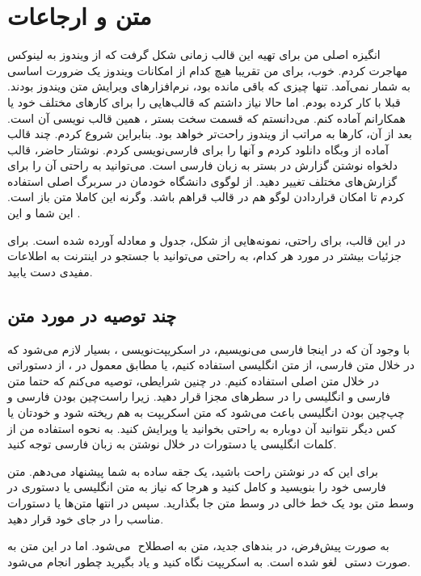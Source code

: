 \chapter{
متن و ارجاعات
}
\label{chap1}

انگیزه اصلی من برای تهیه این قالب زمانی شکل گرفت که از ویندوز به لینوکس مهاجرت کردم. خوب، برای من تقریبا هیچ کدام از امکانات ویندوز یک ضرورت اساسی به شمار نمی‌آمد. تنها چیزی که باقی مانده بود، نرم‌افزارهای ویرایش متن ویندوز بودند. قبلا با
کار کرده بودم. اما حالا نیاز داشتم که قالب‌هایی را برای کارهای مختلف خود یا همکارانم آماده کنم. می‌دانستم که قسمت سخت بستر
، همین قالب نویسی آن است. بعد از آن، کارها به مراتب از ویندوز راحت‌تر خواهد بود. بنابراین شروع کردم. چند قالب آماده از وبگاه
دانلود کردم و آنها را برای فارسی‌نویسی
کردم. نوشتار حاضر، قالب دلخواه نوشتن گزارش در بستر
به زبان فارسی است. می‌توانید به راحتی آن را برای گزارش‌های مختلف تغییر دهید. از لوگوی دانشگاه خودمان در سربرگ اصلی استفاده کردم تا امکان قراردادن لوگو هم در قالب قراهم باشد. وگرنه این کاملا متن باز است. این شما و این
.


در این قالب، برای راحتی، نمونه‌هایی از شکل، جدول و معادله آورده شده است. برای جزئیات بیشتر در مورد هر کدام، به راحتی می‌توانید با جستجو در اینترنت به اطلاعات مفیدی دست یابید. 

\section{ 
چند توصیه در مورد متن
}
\label{sec:text} 

با وجود آن که در اینجا فارسی می‌نویسیم، در اسکریپت‌نویسی
، بسیار لازم می‌شود که در خلال متن فارسی، از متن انگلیسی استفاده کنیم، یا مطابق معمول در
، از دستوراتی در خلال متن اصلی استفاده کنیم. در چنین شرایطی، توصیه می‌کنم که حتما متن فارسی و انگلیسی را در سطرهای مجزا قرار دهید. زیرا راست‌چین بودن فارسی و چپ‌چین بودن انگلیسی باعث می‌شود که متن اسکریپت به هم ریخته شود و خودتان یا کس دیگر نتوانید آن دوباره به راحتی بخوانید یا ویرایش کنید. به نحوه استفاده من از کلمات انگلیسی یا دستورات در خلال نوشتن به زبان فارسی توجه کنید.

برای این که در نوشتن راحت باشید، یک جقه ساده به شما پیشنهاد می‌دهم. متن فارسی خود را بنویسید و کامل کنید و هرجا که نیاز به متن انگلیسی یا دستوری در وسط متن بود یک خط خالی در وسط متن جا بگذارید. سپس در انتها متن‌ها یا دستورات مناسب را در جای خود قرار دهید.

\noindent
به صورت پیش‌فرض، در بندهای جدید، متن به اصطلاح
‌
می‌شود. اما در این متن به صورت دستی
‌
لغو شده است. به اسکریپت نگاه کنید و یاد بگیرید چطور انجام می‌شود.


